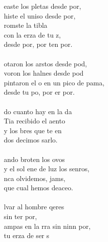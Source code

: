 \begin{cancion}%
	easte los pletas desde  por,\\
	histe el uniso desde  por,\\
	romste la tibla \\
	con la erza de tu z,\\
	desde  por, por ten por.\\
	\jump\\
	otaron los arstos desde  pod,\\
	voron los halnes desde pod\\
	pintaron el o en un pico de pama,\\
	desde tu po, por er por.\\
	\jump\\
	do cuanto hay en la da\\
	Tia recibido el aento\\
	y los bres que te en\\
	dos decimos sarlo.  \\
	\jump\\
	ando broten los ovos\\
	y el sol ene de luz los senros,\\
	nca olvidemos, jams,\\
	que cual  hemos deaceo.\\
	\jump\\
	lvar al hombre qeres \\
	sin ter por,\\
	ampas en la rra sin ninn por, \\
	tu erza de ser s\\

\end{cancion}
